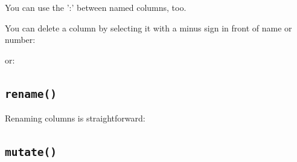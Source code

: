 \documentclass[titlepage]{book}\usepackage{knitr}
\begin{document}
\begin{knitrout}
\color{fgcolor}\begin{kframe}
\begin{alltt}
 \hlkwb{<-}  \hlopt{:}\hlstd{)}
\end{alltt}
\end{kframe}
\end{knitrout}
You can use the ':' between named columns, too.


You can delete a column by selecting it with a minus sign in front of name or number:
\begin{knitrout}
\color{fgcolor}\begin{kframe}
\begin{alltt}
 \hlkwb{<-}  \hlopt{-}
\end{alltt}
\end{kframe}
\end{knitrout}
or:
\begin{knitrout}
\color{fgcolor}\begin{kframe}
\begin{alltt}
 \hlkwb{<-}  \hlopt{-}\hlstd{)}
\end{alltt}
\end{kframe}
\end{knitrout}

\subsection{\texttt{rename()}} 

Renaming columns is straightforward:
\begin{knitrout}
\color{fgcolor}\begin{kframe}
\begin{alltt}
 \hlkwb{<-}     
\end{alltt}
\end{kframe}
\end{knitrout}

\subsection{\texttt{mutate()}}
\end{document}
